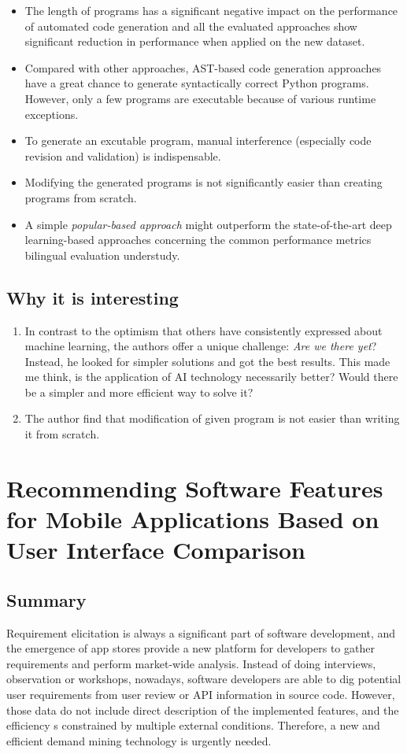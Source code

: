 \documentclass[10pt,conference]{IEEEtran}
\begin{document}
\begin{itemize}
    \item The length of programs has a significant negative impact on the performance of automated code generation and all the evaluated approaches show significant reduction in performance when applied on the new dataset.
    \item Compared with other approaches, AST-based code generation approaches have a great chance to generate syntactically correct Python programs. However, only a few programs are executable because of various runtime exceptions.
    \item To generate an excutable program, manual interference (especially code revision and validation) is indispensable.
    \item Modifying the generated programs is not significantly easier than creating programs from scratch.
    \item A simple \emph{popular-based approach} might outperform the state-of-the-art deep learning-based approaches concerning the common performance metrics bilingual evaluation understudy. 
\end{itemize}

\subsection{Why it is interesting}
\begin{enumerate}
    \item In contrast to the optimism that others have consistently expressed about machine learning, the authors offer a unique challenge: \emph{Are we there yet}? Instead, he looked for simpler solutions and got the best results. This made me think, is the application of AI technology necessarily better? Would there be a simpler and more efficient way to solve it?
    \item The author find that modification of given program is not easier than writing it from scratch.
\end{enumerate}

\section{Recommending Software Features for Mobile Applications Based on User Interface Comparison\cite{chen2019recommending}}

\subsection{Summary}
Requirement elicitation is always a significant part of software development, and the emergence of app stores provide a new platform for developers to gather requirements and perform market-wide analysis. Instead of doing interviews, observation or workshops, nowadays, software developers are able to dig potential user requirements from user review or API information in source code. However, those data do not include direct description of the implemented features, and the efficiency s constrained by multiple external conditions. Therefore,  a new and efficient demand mining technology is urgently needed.
\end{document}

